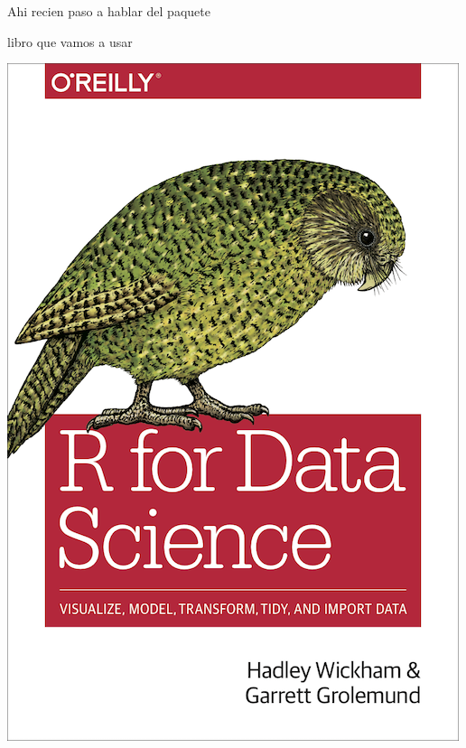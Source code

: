 \documentclass[ignorenonframetext,]{beamer}
\begin{document}
\begin{frame}{Ahi recien paso a hablar del paquete}
\protect\hypertarget{ahi-recien-paso-a-hablar-del-paquete}{}

\end{frame}

\begin{frame}{libro que vamos a usar}
\protect\hypertarget{libro-que-vamos-a-usar}{}

\includegraphics{cover_rfordatascience.png}

\end{frame}
\end{document}
